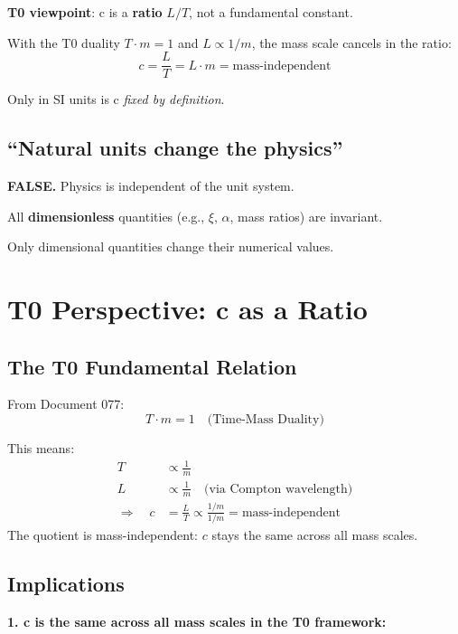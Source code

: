 	\textbf{T0 viewpoint}: c is a \textbf{ratio} $L/T$, not a fundamental constant.
	
	With the T0 duality $T \cdot m = 1$ and $L \propto 1/m$, the mass scale cancels in the ratio:
	\begin{equation}
		c = \frac{L}{T} = L \cdot m = \text{mass-independent}
	\end{equation}
	
	Only in SI units is c \emph{fixed by definition}.
	
	\subsection{``Natural units change the physics''}
	
	\textbf{FALSE.} Physics is independent of the unit system.
	
	All \textbf{dimensionless} quantities (e.g., $\xi$, $\alpha$, mass ratios) are invariant.
	
	Only dimensional quantities change their numerical values.
	
	\section{T0 Perspective: c as a Ratio}
	
	\subsection{The T0 Fundamental Relation}
	
	From Document 077:
	\begin{equation}
		T \cdot m = 1 \quad \text{(Time-Mass Duality)}
	\end{equation}
	
	This means:
	\begin{align}
		T &\propto \frac{1}{m} \\
		L &\propto \frac{1}{m} \quad \text{(via Compton wavelength)} \\
		\Rightarrow \quad c &= \frac{L}{T} \propto \frac{1/m}{1/m} = \text{mass-independent}
	\end{align}
	The quotient is mass-independent: $c$ stays the same across all mass scales.
	
	\subsection{Implications}
	
	\textbf{1. c is the same across all mass scales in the T0 framework:}
	
